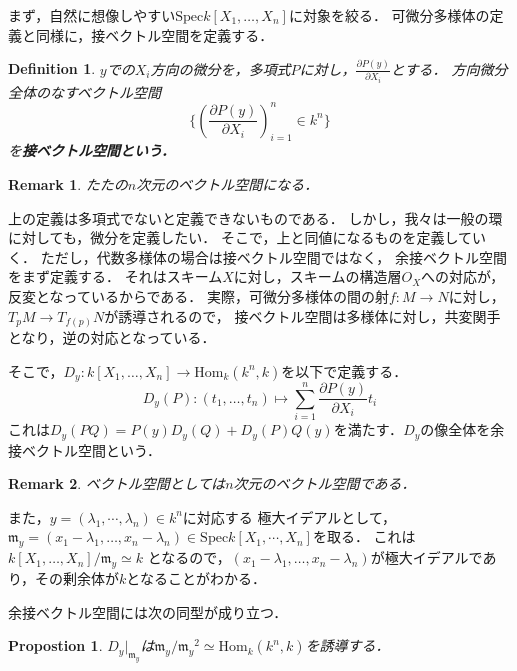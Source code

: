 \documentclass{ujarticle}
\newtheorem{dfn}[thm]{Definition}
\newtheorem{prop}[thm]{Propostion}
\newtheorem*{rem}{Remark}
\begin{document}
まず，自然に想像しやすい$\mathrm{Spec}k[X_1,\dots,X_n]$に対象を絞る．
可微分多様体の定義と同様に，接ベクトル空間を定義する．
\begin{dfn}
  $y$での$X_i$方向の微分を，多項式$P$に対し，$\frac{ \partial  P(y)}{ \partial X_i}$とする．
  方向微分全体のなすベクトル空間
  \begin{equation*}
  \{ \left( \frac{\partial P(y)}{ \partial X_i} \right)_{i=1}^n \in k^n \}
  \end{equation*}
  を\bf{接ベクトル空間}という．
\end{dfn}
\begin{rem}
 たたの$n$次元のベクトル空間になる．
\end{rem}


上の定義は多項式でないと定義できないものである．
しかし，我々は一般の環に対しても，微分を定義したい．
そこで，上と同値になるものを定義していく．
ただし，代数多様体の場合は接ベクトル空間ではなく，
余接ベクトル空間をまず定義する．
それはスキーム$X$に対し，スキームの構造層$O_{X}$への対応が，反変となっているからである．
実際，可微分多様体の間の射$f:M \to N$に対し，$T_pM \to T_{f(p)}N$が誘導されるので，
接ベクトル空間は多様体に対し，共変関手となり，逆の対応となっている．


そこで，$D_y:k[X_1,\dots,X_n ] \to \mathrm{Hom}_{k}(k^n,k)$を以下で定義する．
\begin{equation*}
    D_y(P):(t_1,\dots,t_n) \mapsto \sum_{i=1}^n\frac{ \partial  P(y)}{ \partial X_i}t_i
\end{equation*}
これは$D_y(PQ)=P(y)D_y(Q)+D_y(P)Q(y)$を満たす．$D_y$の像全体を余接ベクトル空間という．
\begin{rem}
 ベクトル空間としては$n$次元のベクトル空間である．
\end{rem}

また，$y=(\lambda_1,\cdots,\lambda_n) \in k^n$に対応する
極大イデアルとして，$\mathfrak{m}_y=(x_1 -\lambda_1, \dots,x_n -\lambda_n)
\in \mathrm{Spec}k[X_1, \cdots,X_n]$を取る．
これは$k[X_1,\dots,X_n]/\mathfrak{m}_y \simeq k$
となるので，$(x_1 -\lambda_1, \dots,x_n -\lambda_n)$が極大イデアルであり，その剰余体が$k$となることがわかる．

余接ベクトル空間には次の同型が成り立つ．


\begin{prop}
 $D_y|_{\mathfrak{m}_y}$は$\mathfrak{m}_y/{\mathfrak{m}_y}^2 \simeq \mathrm{Hom}_{k}(k^n,k)$を誘導する．
\end{prop}
\end{document}

